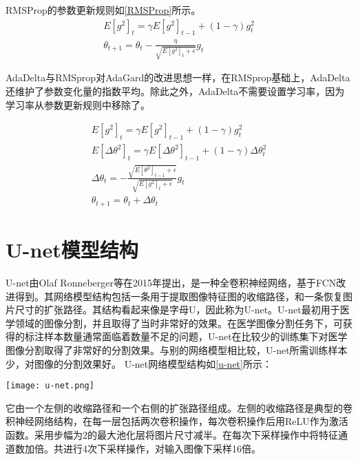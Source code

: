 \documentclass[AutoFakeBold]{LZUThesis}
\begin{document}
RMSProp的参数更新规则如\cref{RMSProp}所示。
\begin{equation}
    \begin{aligned}
        E[g^2]_t=\gamma E[g^2]_{t-1}+(1-\gamma)g^2_{t} \\
        \theta_{t+1}=\theta_{t}-\frac{\eta}{\sqrt{E[g^2]_t+\epsilon}}g_{t}
    \end{aligned}
    \label{RMSProp}
\end{equation}

AdaDelta\textsuperscript{\cite{zeiler2012adadelta}}与RMSprop对AdaGard的改进思想一样，在RMSprop基础上，AdaDelta还维护了参数变化量的指数平均。除此之外，AdaDelta不需要设置学习率，因为学习率从参数更新规则中移除了。

\begin{equation}
    \begin{aligned}
        E[g^2]_t=\gamma E[g^2]_{t-1}+(1-\gamma)g^2_{t}                                               \\
        E[{\Delta} {\theta^2}]_t=\gamma E[{\Delta} {\theta^2}]_{t-1}+(1-\gamma){\Delta} {\theta_t^2} \\
        \Delta \theta_t=-\frac{\sqrt{E[\theta^2]_{t-1}+\epsilon}}{\sqrt{E[g^2]_t+\epsilon}}g_{t}     \\
        \theta_{t+1}=\theta_{t}+\Delta \theta_t
    \end{aligned}
    \label{AdaDelta}
\end{equation}

\section{U-net模型结构}


U-net由Olaf Ronneberger等\textsuperscript{\cite{ronneberger2015u}}在2015年提出，是一种全卷积神经网络，基于FCN改进得到。其网络模型结构包括一条用于提取图像特征图的收缩路径，和一条恢复图片尺寸的扩张路径。其结构看起来像是字母U，因此称为U-net。U-net最初用于医学领域的图像分割，并且取得了当时非常好的效果。在医学图像分割任务下，可获得的标注样本数量通常面临着数量不足的问题，U-net在比较少的训练集下对医学图像分割取得了非常好的分割效果。与别的网络模型相比较，U-net所需训练样本少，对图像的分割效果好。
U-net网络模型结构如\cref{u-net}\textsuperscript{\cite{ronneberger2015u}}所示：

\begin{figure*}[htbp]
    \centering
    \texttt{[image: u-net.png]}
    \caption{U-net网络模型结构}
    \label{u-net}
\end{figure*}
它由一个左侧的收缩路径和一个右侧的扩张路径组成。左侧的收缩路径是典型的卷积神经网络结构，在每一层包括两次卷积操作，每次卷积操作后用ReLU作为激活函数。采用步幅为2的最大池化层将图片尺寸减半。在每次下采样操作中将特征通道数加倍。共进行4次下采样操作，对输入图像下采样16倍。
\end{document}
